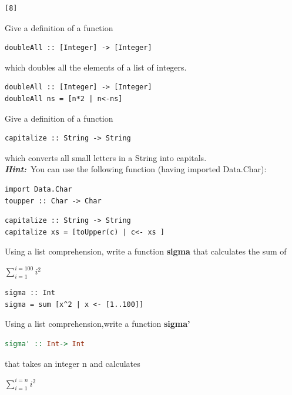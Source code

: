 \documentclass{article}
\begin{document}
\begin{solution}
\begin{lstlisting}
[8]
\end{lstlisting}
\end{solution}

\pagebreak
\begin{exercise}
Give a  definition of a function 
\begin{lstlisting}
doubleAll :: [Integer] -> [Integer]
\end{lstlisting}
which doubles all the elements of a list of integers. 
\end{exercise}

\begin{solution}
\begin{lstlisting}
doubleAll :: [Integer] -> [Integer]
doubleAll ns = [n*2 | n<-ns]
\end{lstlisting}
\end{solution}
\begin{exercise}
Give a  definition of a function 
\begin{lstlisting}
capitalize :: String -> String
\end{lstlisting}
which converts all small letters in a String into capitals.\\
\textbf{\textit{Hint:}}\ You can use the following function (having imported Data.Char):
\begin{lstlisting}
import Data.Char
toupper :: Char -> Char
\end{lstlisting}
\end{exercise}

\begin{solution}
\begin{lstlisting}
capitalize :: String -> String
capitalize xs = [toUpper(c) | c<- xs ]
\end{lstlisting}
\end{solution}

\begin{exercise}
Using a list comprehension, write a function \textbf{sigma} that calculates the sum of 
\begin{center}
  $ \sum_{i=1}^{i=100} {i^2} $
\end{center}
\end{exercise}

\begin{solution}
\begin{lstlisting}
sigma :: Int
sigma = sum [x^2 | x <- [1..100]]
\end{lstlisting}
\end{solution}
\pagebreak
\begin{exercise}
Using a list comprehension,write a function \textbf{sigma'}
\begin{lstlisting}[language=Haskell]
sigma' :: Int-> Int
\end{lstlisting}
that takes an integer n and calculates 
\begin{center}
  $ \sum_{i=1}^{i=n} {i^2} $
\end{center}
\end{exercise}
\end{document}
